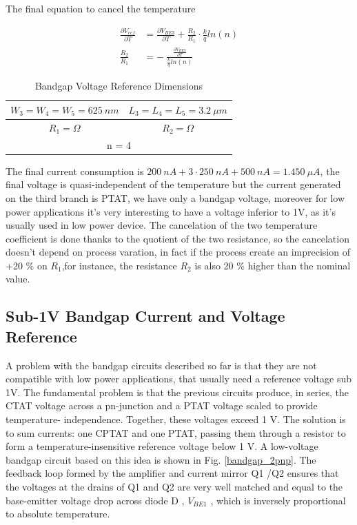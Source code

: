 \documentclass[11pt,a4paper]{report}
\begin{document}
The final equation to cancel the temperature

\begin{align}
  \frac{\partial V_{ref}}{\partial T} & = \frac{\partial V_{BE3}}{\partial T} + \frac{R_2}{R_1} \cdot \frac{k}{q}ln(n) \\
  \frac{R_2}{R_1}                     & = - ~ \frac{ \frac{\partial V_{BE3}}{\partial T} }{ \frac{k}{q}ln(n) }
\end{align}

\begin{table}[h]
  \begin{center}
  \begin{tabular}{|c|c|}\hline
    $W_3 = W_4 = W_5 = 625 ~nm $ & $L_3 = L_4 = L_5 = 3.2~\mu m$ \\ \hline 
    $R_1 =  \Omega$     & $R_2 = \Omega $  \\ \hline \hline
    \multicolumn{2}{|c|}{n = 4} \\ \hline
  \end{tabular}
\end{center}
  \caption{Bandgap Voltage Reference Dimensions}
\end{table}

The final current consumption is $200~nA + 3\cdot250~nA + 500~nA = 1.450~\mu A $, the final voltage is quasi-independent of the temperature but the current generated on the third branch is PTAT, we have only a bandgap voltage, moreover for low power applications it's very interesting to have a voltage inferior to 1V, as it's usually used in low power device. The cancelation of the two temperature coefficient is done thanks to the quotient of the two resistance, so the cancelation doesn't depend on process varation, in fact if the process create an imprecision of +20 \% on $R_1$,for instance, the resistance $R_2$ is also 20 \% higher than the nominal value.

\subsection{ Sub-1V Bandgap Current and Voltage Reference}

A problem with the bandgap circuits described so far is that they are not compatible with low power applications, that  usually need a reference voltage sub 1V. The fundamental problem is that the previous circuits produce, in series, the CTAT voltage across a pn-junction and a PTAT voltage scaled to provide temperature- independence. Together, these voltages exceed 1 V. The solution is to sum currents: one CPTAT and one PTAT, passing them through a resistor to form a temperature-insensitive reference voltage below 1 V.
A low-voltage bandgap circuit based on this idea is shown in Fig. \ref{bandgap_2pnp}. The feedback loop formed by the amplifier and current mirror Q1 /Q2 ensures that the voltages at the drains of Q1 and Q2 are very well matched and equal to the base-emitter voltage drop across diode D , $V_{BE1}$ , which is inversely proportional to absolute temperature.
 
\end{document}
